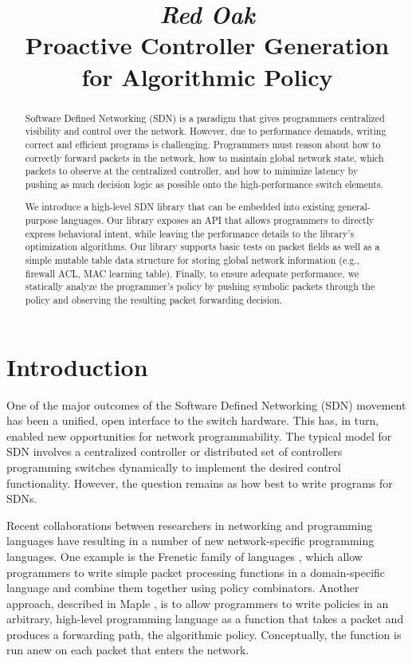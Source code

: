 \documentclass[preprint]{sigplanconf}
\title{\textit{Red Oak}\\ Proactive Controller Generation for Algorithmic Policy}
\begin{document}
\maketitle


\begin{abstract}
Software Defined Networking (SDN) is a paradigm that gives programmers 
centralized visibility and control over the network. However, due to performance 
demands, writing correct and efficient programs is challenging. Programmers must 
reason about how to correctly forward packets in the network, how to maintain
global network state, which packets to observe at the centralized controller, 
and how to minimize latency by pushing as much decision logic
as possible onto the high-performance switch elements.

We introduce a high-level SDN library that can be embedded into existing general-purpose languages.
Our library exposes an API that allows programmers to directly express behavioral intent, 
while leaving the performance details to the library's optimization algorithms.
Our library supports basic tests on packet fields as well as a simple mutable table
data structure for storing global network information (e.g., firewall ACL, MAC learning table).
Finally, to ensure adequate performance, 
we statically analyze the programmer's policy by pushing symbolic packets through the policy 
and observing the resulting packet forwarding decision.
\end{abstract}


\section*{Introduction}

One of the major outcomes of the Software Defined Networking (SDN) movement has been a unified, open interface to the switch hardware. This has, in turn, enabled new opportunities for network programmability. The typical model for SDN involves a centralized controller or distributed set of controllers programming switches dynamically to implement the desired control functionality.
However, the question remains as how best to write programs for SDNs.

Recent collaborations between researchers in networking and programming languages have resulting in a number of new network-specific programming languages. One example is the Frenetic family of languages \cite{Frenetic}, which allow programmers to write simple packet processing functions in a domain-specific language and combine them together using policy combinators. Another approach, described in Maple \cite{Maple}, is to allow programmers to write policies in an arbitrary, high-level programming language as a function that takes a packet and produces a forwarding path, the algorithmic policy. Conceptually, the function is run anew on each packet that enters the network.
\end{document}
